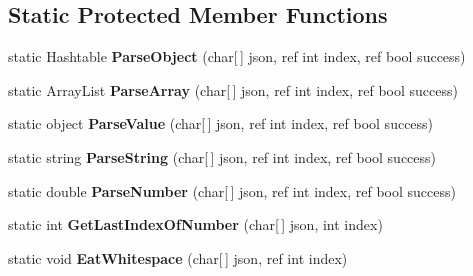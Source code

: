 \subsection*{Static Protected Member Functions}
\begin{DoxyCompactItemize}
\item 
\hypertarget{classProcurios_1_1Public_1_1JSON_af852c7ed4890451db945c293a379d167}{static Hashtable {\bfseries Parse\-Object} (char\mbox{[}$\,$\mbox{]} json, ref int index, ref bool success)}\label{classProcurios_1_1Public_1_1JSON_af852c7ed4890451db945c293a379d167}

\item 
\hypertarget{classProcurios_1_1Public_1_1JSON_aff252e51e51c76379df2e8b40b576d86}{static Array\-List {\bfseries Parse\-Array} (char\mbox{[}$\,$\mbox{]} json, ref int index, ref bool success)}\label{classProcurios_1_1Public_1_1JSON_aff252e51e51c76379df2e8b40b576d86}

\item 
\hypertarget{classProcurios_1_1Public_1_1JSON_a4f7e2cc33426af7ded9d103e5f23d2d2}{static object {\bfseries Parse\-Value} (char\mbox{[}$\,$\mbox{]} json, ref int index, ref bool success)}\label{classProcurios_1_1Public_1_1JSON_a4f7e2cc33426af7ded9d103e5f23d2d2}

\item 
\hypertarget{classProcurios_1_1Public_1_1JSON_a5c5148412fd6dca5b5ee9be8c941badb}{static string {\bfseries Parse\-String} (char\mbox{[}$\,$\mbox{]} json, ref int index, ref bool success)}\label{classProcurios_1_1Public_1_1JSON_a5c5148412fd6dca5b5ee9be8c941badb}

\item 
\hypertarget{classProcurios_1_1Public_1_1JSON_a9fc88d5958596687e2f0c6134ca01ff1}{static double {\bfseries Parse\-Number} (char\mbox{[}$\,$\mbox{]} json, ref int index, ref bool success)}\label{classProcurios_1_1Public_1_1JSON_a9fc88d5958596687e2f0c6134ca01ff1}

\item 
\hypertarget{classProcurios_1_1Public_1_1JSON_a462d244f6c9abc1bcfe488cc50b10fb5}{static int {\bfseries Get\-Last\-Index\-Of\-Number} (char\mbox{[}$\,$\mbox{]} json, int index)}\label{classProcurios_1_1Public_1_1JSON_a462d244f6c9abc1bcfe488cc50b10fb5}

\item 
\hypertarget{classProcurios_1_1Public_1_1JSON_a75cab5c641db9ca8275b21d3a6b891e4}{static void {\bfseries Eat\-Whitespace} (char\mbox{[}$\,$\mbox{]} json, ref int index)}\label{classProcurios_1_1Public_1_1JSON_a75cab5c641db9ca8275b21d3a6b891e4}


\end{DoxyCompactItemize}
